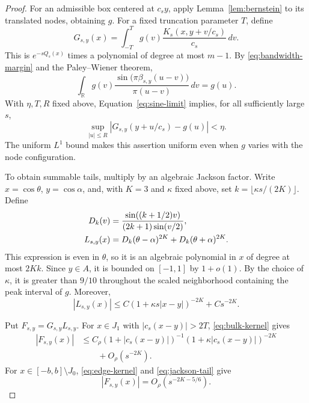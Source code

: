 \documentclass[11pt]{article}
\theoremstyle{definition}
\numberwithin{equation}{section}
\newcommand{\R}{\mathbb R}
\begin{document}
\begin{proof}
For an admissible box centered at \(c_sy\), apply
Lemma~\ref{lem:bernstein} to its translated nodes, obtaining \(g\).
For a fixed truncation parameter \(T\), define
\begin{equation}\label{eq:kernel-projection}
 G_{s,y}(x)=\int_{-T}^{T}
 g(v)\frac{K_s(x,y+v/c_s)}{c_s}\,dv.
\end{equation}
This is \(e^{-sQ_s(x)}\) times a polynomial of degree at most \(m-1\).
By \eqref{eq:bandwidth-margin} and the Paley--Wiener theorem,
\[
 \int_{\R}g(v)
 \frac{\sin\bigl(\pi\beta_{s,y}(u-v)\bigr)}{\pi(u-v)}\,dv=g(u).
\]
With \(\eta,T,R\) fixed above, Equation~\eqref{eq:sine-limit}
implies, for all sufficiently large \(s\),
\begin{equation}\label{eq:projection-approximation}
 \sup_{|u|\le R}|G_{s,y}(y+u/c_s)-g(u)|<\eta.
\end{equation}
The uniform \(L^1\) bound makes this assertion uniform even when
\(g\) varies with the node configuration.

To obtain summable tails, multiply by an algebraic Jackson factor.
Write \(x=\cos\theta\), \(y=\cos\alpha\), and, with \(K=3\) and
\(\kappa\) fixed above, set \(k=\lfloor\kappa s/(2K)\rfloor\).
Define
\begin{align}
 D_k(v)&=\frac{\sin((k+1/2)v)}{(2k+1)\sin(v/2)},\notag\\
 L_{s,y}(x)&=D_k(\theta-\alpha)^{2K}
             +D_k(\theta+\alpha)^{2K}. \label{eq:jackson}
\end{align}
This expression is even in \(\theta\), so it is an algebraic
polynomial in \(x\) of degree at most \(2Kk\).
Since \(y\in A\), it is bounded on \([-1,1]\) by \(1+o(1)\).
By the choice of \(\kappa\), it is greater than \(9/10\) throughout
the scaled neighborhood containing the peak interval of \(g\).
Moreover,
\begin{equation}\label{eq:jackson-tail}
 |L_{s,y}(x)|\le
 C(1+\kappa s|x-y|)^{-2K}+Cs^{-2K}.
\end{equation}

Put \(F_{s,y}=G_{s,y}L_{s,y}\).
For \(x\in J_1\) with \(|c_s(x-y)|>2T\),
\eqref{eq:bulk-kernel} gives
\begin{equation}\label{eq:weighted-tail}
 \begin{split}
 |F_{s,y}(x)|
 &\le C_\rho(1+|c_s(x-y)|)^{-1}
       (1+\kappa|c_s(x-y)|)^{-2K}\\
 &\hspace{2em}+O_\rho(s^{-2K}).
 \end{split}
\end{equation}
For \(x\in[-b,b]\setminus J_0\),
\eqref{eq:edge-kernel} and \eqref{eq:jackson-tail} give
\begin{equation}\label{eq:weighted-edge}
 |F_{s,y}(x)|=O_\rho(s^{-2K-5/6}).
\end{equation}


\end{proof}
\end{document}
